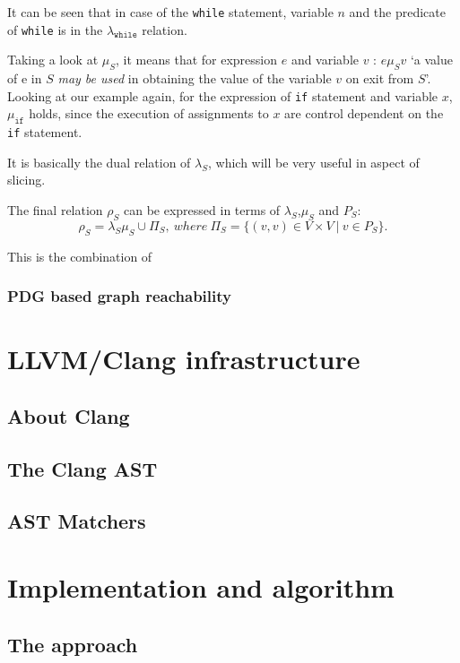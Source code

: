\documentclass[oneside,12pt,a4paper]{book}
\begin{document}
It can be seen that in case of the \texttt{while} statement, variable $n$ and the predicate of \texttt{while} is in the $\lambda_{\texttt{while}}$ relation.

Taking a look at $\mu_S$, it means that for expression $e$ and variable $v$ : $e \mu_S v$ `a value of e in $S$ \textit{may be used} in obtaining the value of the variable $v$ on exit from $S$'. Looking at our example again, for the expression of \texttt{if} statement and variable $x$, $\mu_{\texttt{if}}$ holds, since the execution of assignments to $x$ are control dependent on the \texttt{if} statement.

It is basically the dual relation of $\lambda_S$, which will be very useful in aspect of slicing.

The final relation $\rho_S$ can be expressed in terms of $\lambda_S$,$\mu_S$ and $P_S$:
\begin{equation}
\rho_S = \lambda_S\mu_S \cup \Pi_S,\  where \ \Pi_S = \{(v,v) \in V \times V\ |\ v \in P_S\}.
\end{equation}

This is the combination of 




\subsection{PDG based graph reachability}


\chapter{LLVM/Clang infrastructure}
\section{About Clang}
\section{The Clang AST}
\section{AST Matchers}

\chapter{Implementation and algorithm}
\section{The approach}
\end{document}
